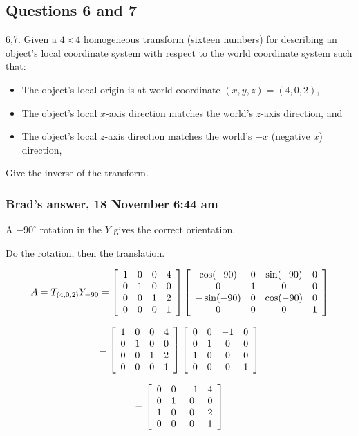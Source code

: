 \documentclass[11pt]{article}
\begin{document}
\begin{spacing}{1.2}
\subsection{Questions 6 and 7}
6,7.  Given a $4 \times 4$ homogeneous transform (sixteen numbers) for describing an object's local coordinate system with respect to the world coordinate system such that:

\begin{itemize}
	\item The object's local origin is at world coordinate $(x,y,z) = (4,0,2)$,
	\item The object's local $x$-axis direction matches the world's $z$-axis direction, and 
	\item The object's local $z$-axis direction matches the world's $-x$ (negative $x$) direction, 
\end{itemize}

Give the inverse of the transform.  

\subsubsection{Brad's answer, 18 November 6:44 am}

A $-90^{\circ}$ rotation in the $Y$ gives the correct orientation. 

Do the rotation, then the translation.  

$$A = T_{(4,0,2)} Y_{-90} = 
\left[
\begin{array}{cccc}
	1 & 0 & 0 & 4 \cr
	0 & 1 & 0 & 0 \cr
	0 & 0 & 1 & 2 \cr
	0 & 0 & 0 & 1 \cr
\end{array}
\right]
\left[
	\begin{array}{cccc}
		\cos (-90) & 0 & \sin (-90) & 0 \cr
		0 & 1 & 0 & 0 \cr
		-\sin(-90) & 0 & \cos (-90) & 0 \cr
		0 & 0 & 0 & 1 \cr
	\end{array}
\right]
$$

$$= 
\left[
\begin{array}{cccc}
	1 & 0 & 0 & 4 \cr
	0 & 1 & 0 & 0 \cr
	0 & 0 & 1 & 2 \cr
	0 & 0 & 0 & 1 \cr
\end{array}
\right]
\left[
	\begin{array}{cccc}
		0 & 0 & -1 & 0 \cr
		0 & 1 & 0 & 0 \cr
		1 & 0 & 0 & 0 \cr
		0 & 0 & 0 & 1 \cr
	\end{array}
\right]
$$

$$= 
\left[
	\begin{array}{cccc}
		0 & 0 & -1 & 4 \cr
		0 & 1 & 0 & 0 \cr
		1 & 0 & 0 & 2 \cr
		0 & 0 & 0 & 1 \cr
	\end{array}
\right]
$$


\end{spacing}
\end{document}
